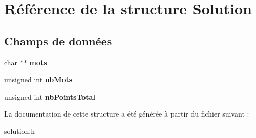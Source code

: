 \hypertarget{structSolution}{
\section{Référence de la structure Solution}
\label{structSolution}
}
\subsection*{Champs de données}
\begin{DoxyCompactItemize}
\item 
\hypertarget{structSolution_ab511245410043c846351c6acf272d656}{
char $\ast$$\ast$ {\bfseries mots}}
\label{structSolution_ab511245410043c846351c6acf272d656}

\item 
\hypertarget{structSolution_a60e0881a49e593091d2210dd49f2f51a}{
unsigned int {\bfseries nbMots}}
\label{structSolution_a60e0881a49e593091d2210dd49f2f51a}

\item 
\hypertarget{structSolution_a25fcaf3e9fa7e1a59a149f959f185826}{
unsigned int {\bfseries nbPointsTotal}}
\label{structSolution_a25fcaf3e9fa7e1a59a149f959f185826}

\end{DoxyCompactItemize}


La documentation de cette structure a été générée à partir du fichier suivant :\begin{DoxyCompactItemize}
\item 
solution.h\end{DoxyCompactItemize}
